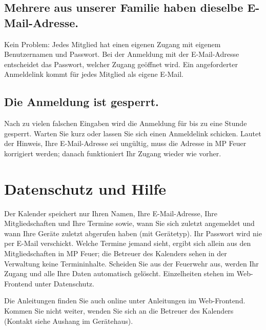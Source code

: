 \documentclass[a4paper,fontsize=10pt]{scrartcl}
\newcommand{\hilfe}{die Betreuer des Kalenders (Kontakt siehe Aushang im Gerätehaus)}
\newcommand{\menue}[1]{\textsf{#1}}
\begin{document}
\subsection*{Mehrere aus unserer Familie haben dieselbe E-Mail-Adresse.}
Kein Problem: Jedes Mitglied hat einen eigenen Zugang mit eigenem
Benutzernamen und Passwort. Bei der Anmeldung mit der E-Mail-Adresse
entscheidet das Passwort, welcher Zugang geöffnet wird. Ein angeforderter
Anmeldelink kommt für jedes Mitglied als eigene E-Mail.

\subsection*{Die Anmeldung ist gesperrt.}
Nach zu vielen falschen Eingaben wird die Anmeldung für bis zu eine Stunde
gesperrt. Warten Sie kurz oder lassen Sie sich einen Anmeldelink schicken.
Lautet der Hinweis, Ihre E-Mail-Adresse sei ungültig, muss die Adresse in
MP Feuer korrigiert werden; danach funktioniert Ihr Zugang wieder wie vorher.

\section{Datenschutz und Hilfe}

Der Kalender speichert nur Ihren Namen, Ihre E-Mail-Adresse, Ihre
Mitgliedschaften und Ihre Termine sowie, wann Sie sich zuletzt angemeldet und
wann Ihre Geräte zuletzt abgerufen haben (mit Gerätetyp). Ihr Passwort wird
nie per E-Mail verschickt. Welche Termine jemand sieht, ergibt sich allein aus
den Mitgliedschaften in MP Feuer; die Betreuer des Kalenders sehen in der
Verwaltung keine Termininhalte. Scheiden Sie aus der
Feuerwehr aus, werden Ihr Zugang und alle Ihre Daten automatisch gelöscht.
Einzelheiten stehen im Web-Frontend unter \menue{Datenschutz}.

\begin{dshinweis}[title={Fragen oder Probleme?}]
Die Anleitungen finden Sie auch online unter \menue{Anleitungen} im
Web-Frontend. Kommen Sie nicht weiter, wenden Sie sich an \hilfe.
\end{dshinweis}
\end{document}
